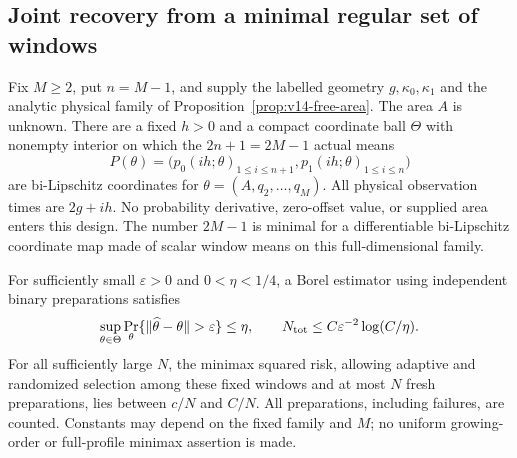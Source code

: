 \subsection{Joint recovery from a minimal regular set of windows}
\begin{theorem}
\label{thm:v14-area-windows}
Fix $M\ge2$, put $n=M-1$, and supply the labelled geometry
$g,\kappa_0,\kappa_1$ and the analytic physical family of
Proposition~\ref{prop:v14-free-area}. The area $A$ is unknown.
There are a fixed $h>0$ and a compact coordinate ball $\Theta$ with
nonempty interior on which the $2n+1=2M-1$ actual means
\begin{equation}\label{eq:v14-area-windows}
 P(\theta)=
 \bigl(p_0(ih;\theta)_{1\le i\le n+1},
       p_1(ih;\theta)_{1\le i\le n}\bigr)
\end{equation}
are bi-Lipschitz coordinates for $\theta=(A,q_2,\ldots,q_M)$.
All physical observation times are $2g+ih$. No probability derivative,
zero-offset value, or supplied area enters this design. The number
$2M-1$ is minimal for a differentiable bi-Lipschitz coordinate map
made of scalar window means on this full-dimensional family.

For sufficiently small $\varepsilon>0$ and $0<\eta<1/4$, a Borel
estimator using independent binary preparations satisfies
\begin{equation}\label{eq:v14-area-confidence}
 \sup_{\theta\in\Theta}
 \Pr_\theta\{\|\widehat\theta-\theta\|>\varepsilon\}\le\eta,
 \qquad N_{\rm tot}\le C\varepsilon^{-2}\log(C/\eta).
\end{equation}
For all sufficiently large $N$, the minimax squared risk, allowing
adaptive and randomized selection among these fixed windows and at
most $N$ fresh preparations, lies between $c/N$ and $C/N$.
All preparations, including failures, are counted. Constants may
depend on the fixed family and $M$; no uniform growing-order or
full-profile minimax assertion is made.
\end{theorem}
